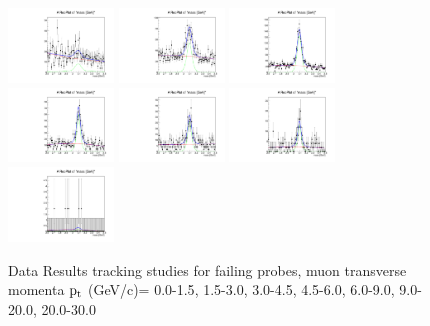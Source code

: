 \documentclass{article}
\begin{document}
\begin{figure}
    \includegraphics[width=0.25\textwidth]{../PlotsRooFitData/croofit_trk_fail_0.pdf}
    \includegraphics[width=0.25\textwidth]{../PlotsRooFitData/croofit_trk_fail_1.pdf}
    \includegraphics[width=0.25\textwidth]{../PlotsRooFitData/croofit_trk_fail_2.pdf}
    \includegraphics[width=0.25\textwidth]{../PlotsRooFitData/croofit_trk_fail_3.pdf}
    \includegraphics[width=0.25\textwidth]{../PlotsRooFitData/croofit_trk_fail_4.pdf}
    \includegraphics[width=0.25\textwidth]{../PlotsRooFitData/croofit_trk_fail_5.pdf}
    \includegraphics[width=0.25\textwidth]{../PlotsRooFitData/croofit_trk_fail_6.pdf}
    \caption{Data Results tracking studies for failing probes, muon transverse momenta
    $\rm p_{t}$ (GeV/c)= {0.0-1.5}, {1.5-3.0}, {3.0-4.5}, {4.5-6.0}, 
    {6.0-9.0}, {9.0-20.0}, {20.0-30.0}}
\end{figure}
\end{document}
